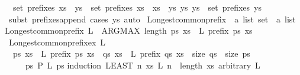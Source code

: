 \begin{isabellebody}
\ \ {\isachardoublequoteopen}set\ {\isacharparenleft}prefixes\ {\isacharparenleft}xs\ {\isacharat}\ ys{\isacharparenright}{\isacharparenright}\ {\isacharequal}\ set\ {\isacharparenleft}prefixes\ xs{\isacharparenright}\ {\isasymunion}\ {\isacharbraceleft}xs\ {\isacharat}\ ys{\isacharprime}\ {\isacharbar}ys{\isacharprime}{\isachardot}\ ys{\isacharprime}\ {\isasymin}\ set\ {\isacharparenleft}prefixes\ ys{\isacharparenright}{\isacharbraceright}{\isachardoublequoteclose}\isanewline
%
\isadelimproof
\ \ %
\endisadelimproof
%
\isatagproof
{}\isamarkupfalse%
\ {\isacharparenleft}subst\ prefixes{\isacharunderscore}append{\isacharcomma}\ cases\ ys{\isacharparenright}\ auto%
\endisatagproof
{\isafoldproof}%
%
\isadelimproof
%
\endisadelimproof
%
\isadelimdocument
%
\endisadelimdocument
%
\isatagdocument
%
\isamarkuptrue%
%
\endisatagdocument
{\isafolddocument}%
%
\isadelimdocument
%
\endisadelimdocument
{}\isamarkupfalse%
\ Longest{\isacharunderscore}common{\isacharunderscore}prefix\ {\isacharcolon}{\isacharcolon}\ {\isachardoublequoteopen}{\isacharprime}a\ list\ set\ {\isasymRightarrow}\ {\isacharprime}a\ list{\isachardoublequoteclose}\ \isanewline
{\isachardoublequoteopen}Longest{\isacharunderscore}common{\isacharunderscore}prefix\ L\ {\isacharequal}\ {\isacharparenleft}ARG{\isacharunderscore}MAX\ length\ ps{\isachardot}\ {\isasymforall}xs\ {\isasymin}\ L{\isachardot}\ prefix\ ps\ xs{\isacharparenright}{\isachardoublequoteclose}\isanewline
\isanewline
{}\isamarkupfalse%
\ Longest{\isacharunderscore}common{\isacharunderscore}prefix{\isacharunderscore}ex{\isacharcolon}\ {\isachardoublequoteopen}L\ {\isasymnoteq}\ {\isacharbraceleft}{\isacharbraceright}\ {\isasymLongrightarrow}\isanewline
\ \ {\isasymexists}ps{\isachardot}\ {\isacharparenleft}{\isasymforall}xs\ {\isasymin}\ L{\isachardot}\ prefix\ ps\ xs{\isacharparenright}\ {\isasymand}\ {\isacharparenleft}{\isasymforall}qs{\isachardot}\ {\isacharparenleft}{\isasymforall}xs\ {\isasymin}\ L{\isachardot}\ prefix\ qs\ xs{\isacharparenright}\ {\isasymlongrightarrow}\ size\ qs\ {\isasymle}\ size\ ps{\isacharparenright}{\isachardoublequoteclose}\isanewline
\ \ {\isacharparenleft}\ {\isachardoublequoteopen}{\isacharunderscore}\ {\isasymLongrightarrow}\ {\isasymexists}ps{\isachardot}\ {\isacharquery}P\ L\ ps{\isachardoublequoteclose}{\isacharparenright}\isanewline
%
\isadelimproof
%
\endisadelimproof
%
\isatagproof
{}\isamarkupfalse%
{\isacharparenleft}induction\ {\isachardoublequoteopen}LEAST\ n{\isachardot}\ {\isasymexists}xs\ {\isasymin}L{\isachardot}\ n\ {\isacharequal}\ length\ xs{\isachardoublequoteclose}\ arbitrary{\isacharcolon}\ L{\isacharparenright}\isanewline

\end{isabellebody}

